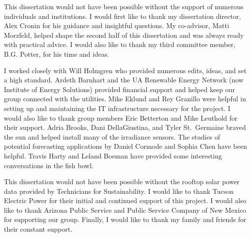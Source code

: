 This dissertation would not have been possible without the support of
numerous individuals and institutions.
I would first like to thank my dissertation director, Alex Cronin for
his guidance and insightful questions.
My co-advisor, Matti Morzfeld, helped shape the second half of this
dissertation and was always ready with practical advice.
I would also like to thank my third committee member, B.G. Potter, for
his time and ideas.

I worked closely with Will Holmgren who provided numerous edits,
ideas, and set a high standard.
Ardeth Barnhart and the UA Renewable Energy Network (now Institute of
Energy Solutions) provided financial support and helped keep our group
connected with the utilities.
Mike Eklund and Rey Granillo were helpful in setting up and
maintaining the IT infrastructure necessary for the project.
I would also like to thank group members Eric Betterton and Mike
Leuthold for their support.
Adria Brooks, Dani DellaGiustina, and Tyler St.\ Germaine braved the
sun and helped install many of the irradiance sensors.
The studies of potential forecasting applications by Daniel Cormode
and Sophia Chen have been helpful.
Travis Harty and Leland Boeman have provided some interesting
conversations in the fish bowl.

This dissertation would not have been possible without the rooftop
solar power data provided by Technicians for Sustainability.
I would like to thank Tucson Electric Power for their initial and
continued support of this project.
I would also like to thank Arizona Public Service and Public Service
Company of New Mexico for supporting our group.
Finally, I would like to thank my family and friends for their
constant support.



